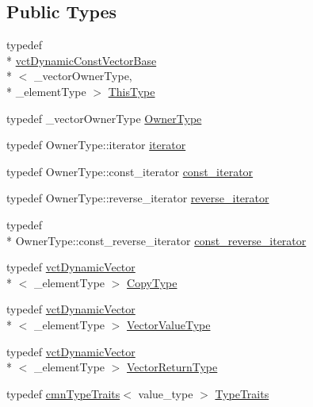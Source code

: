 \subsection*{Public Types}
\begin{DoxyCompactItemize}
\item 
typedef \\*
\hyperlink{classvct_dynamic_const_vector_base}{vct\-Dynamic\-Const\-Vector\-Base}\\*
$<$ \-\_\-vector\-Owner\-Type, \\*
\-\_\-element\-Type $>$ \hyperlink{classvct_dynamic_const_vector_base_a39da273523717f678f54d3321ebca3dd}{This\-Type}
\item 
typedef \-\_\-vector\-Owner\-Type \hyperlink{classvct_dynamic_const_vector_base_a6d92548fcc7076cbd4c091ceb0faf364}{Owner\-Type}
\item 
typedef Owner\-Type\-::iterator \hyperlink{classvct_dynamic_const_vector_base_aaed13bc31a9ee4971bad765ba5c2c811}{iterator}
\item 
typedef Owner\-Type\-::const\-\_\-iterator \hyperlink{classvct_dynamic_const_vector_base_ad04d1e54698ac5e244d15dfacd0e603c}{const\-\_\-iterator}
\item 
typedef Owner\-Type\-::reverse\-\_\-iterator \hyperlink{classvct_dynamic_const_vector_base_af10d167259519ceeca9276da3435e193}{reverse\-\_\-iterator}
\item 
typedef \\*
Owner\-Type\-::const\-\_\-reverse\-\_\-iterator \hyperlink{classvct_dynamic_const_vector_base_aadfcc99550b376238b6c793c17d19ca5}{const\-\_\-reverse\-\_\-iterator}
\item 
typedef \hyperlink{classvct_dynamic_vector}{vct\-Dynamic\-Vector}\\*
$<$ \-\_\-element\-Type $>$ \hyperlink{classvct_dynamic_const_vector_base_a010ba1a93ccebf494be5a188f923eb43}{Copy\-Type}
\item 
typedef \hyperlink{classvct_dynamic_vector}{vct\-Dynamic\-Vector}\\*
$<$ \-\_\-element\-Type $>$ \hyperlink{classvct_dynamic_const_vector_base_a8ffd0619835fb50d43c07502d231e6c8}{Vector\-Value\-Type}
\item 
typedef \hyperlink{classvct_dynamic_vector}{vct\-Dynamic\-Vector}\\*
$<$ \-\_\-element\-Type $>$ \hyperlink{classvct_dynamic_const_vector_base_a379e4153bb82059072257410945bf83c}{Vector\-Return\-Type}
\item 
typedef \hyperlink{classcmn_type_traits}{cmn\-Type\-Traits}$<$ value\-\_\-type $>$ \hyperlink{classvct_dynamic_const_vector_base_a83723d7033db878894d4ab6c39bda2a4}{Type\-Traits}

\end{DoxyCompactItemize}
